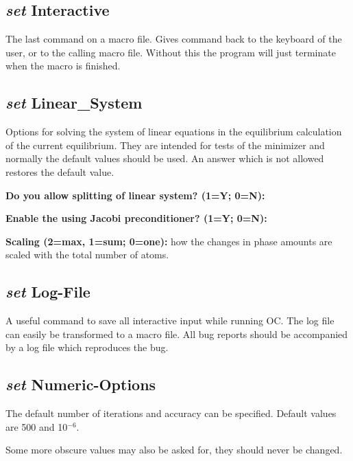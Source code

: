 \documentclass[11pt]{article}
\begin{document}
\subsection{{\em set} Interactive}

The last command on a macro file.  Gives command back to the keyboard
of the user, or to the calling macro file.  Without this the program
will just terminate when the macro is finished.

\hypertarget{Set LINEAR_SYSTEM}{}
\subsection{{\em set} Linear\_System}

Options for solving the system of linear equations in the equilibrium
calculation of the current equilibrium.  They are intended for tests
of the minimizer and normally the default values should be used.  An
answer which is not allowed restores the default value.

{\bf Do you allow splitting of linear system? (1=Y; 0=N):}

{\bf Enable the using Jacobi preconditioner? (1=Y; 0=N):}

{\bf Scaling (2=max, 1=sum; 0=one):} how the changes in phase amounts
are scaled with the total number of atoms.

\hypertarget{Set logfile}{}
\subsection{{\em set} Log-File}

A useful command to save all interactive input while running OC.  The
log file can easily be transformed to a macro file.  All bug reports
should be accompanied by a log file which reproduces the bug.

\hypertarget{Set numeric}{}
\subsection{{\em set} Numeric-Options}

The default number of iterations and accuracy can be specified.
Default values are 500 and 10$^{-6}$.

Some more obscure values may also be asked for, they should never be
changed.

\hypertarget{Set optimizer conditions}{}
\end{document}
